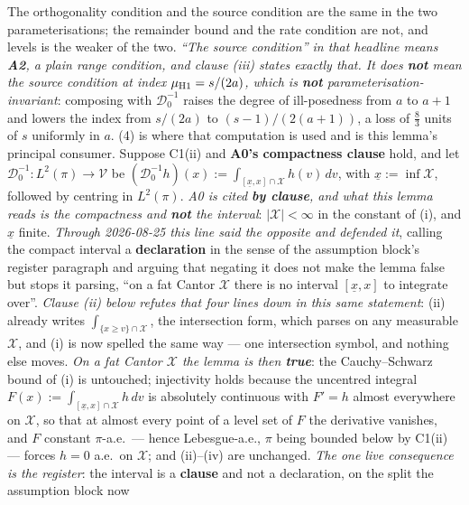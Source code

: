 \begin{lemma}\label{lem:levels}
The orthogonality condition and the source condition are the same in the two parameterisations; the
remainder bound and the rate condition are not, and levels is the weaker of the two.
\emph{``The source condition'' in that headline means \textbf{A2}, a plain range condition, and clause
\textup{(iii)} states exactly that. It does \textbf{not} mean the source condition \emph{at index
$\mu_{\text{\textup{H1}}}=s/(2a)$},
which is \textbf{not} parameterisation-invariant}: composing with $\mathcal D^{-1}_0$ raises the degree of
ill-posedness from $a$ to $a+1$ and lowers the index from $s/(2a)$ to $(s-1)/(2(a+1))$, a loss of
$\tfrac83$ units of $s$ uniformly in $a$. \textup{(4)} is where that computation is used
and is this lemma's principal consumer.
Suppose C1(ii) and \textbf{A0's compactness clause} hold, and let
$\mathcal D^{-1}_0:L^{2}(\pi)\to\mathcal V$ be
$(\mathcal D^{-1}_0h)(x):=\int_{[\underline x,x]\cap\mathcal X}h(v)\,dv$, with
$\underline x:=\inf\mathcal X$, followed by centring in $L^{2}(\pi)$.
\emph{A0 is cited \textbf{by clause}, and what this lemma reads is the compactness and \textbf{not} the
interval}: $|\mathcal X|<\infty$ in the constant of \textup{(i)}, and $\underline x$ finite. \emph{Through
2026-08-25 this line said the opposite and defended it}, calling the compact interval a
\textbf{declaration} in the sense of the assumption block's register paragraph and arguing that negating
it does not make the lemma false but stops it parsing, ``on a fat Cantor $\mathcal X$ there is no
interval $[\underline x,x]$ to integrate over''. \emph{Clause \textup{(ii)} below refutes that four lines
down in this same statement}: \textup{(ii)} already writes $\int_{\{x\ge v\}\cap\mathcal X}$, the
intersection form, which parses on any measurable $\mathcal X$, and \textup{(i)} is now spelled the same
way --- one intersection symbol, and nothing else moves. \emph{On a fat Cantor $\mathcal X$ the lemma is
then \textbf{true}}: the Cauchy--Schwarz bound of \textup{(i)} is untouched; injectivity holds because
the uncentred integral $F(x):=\int_{[\underline x,x]\cap\mathcal X}h\,dv$ is absolutely continuous with
$F'=h$ almost everywhere on $\mathcal X$, so that at almost every point of a level set of $F$ the
derivative vanishes, and $F$ constant $\pi$-a.e.\ --- hence Lebesgue-a.e., $\pi$ being bounded below by
C1(ii) --- forces $h=0$ a.e.\ on $\mathcal X$; and \textup{(ii)}--\textup{(iv)} are unchanged. \emph{The one live consequence is the
register}: the interval is a \textbf{clause} and not a declaration, on the split the assumption block now

\end{lemma}
